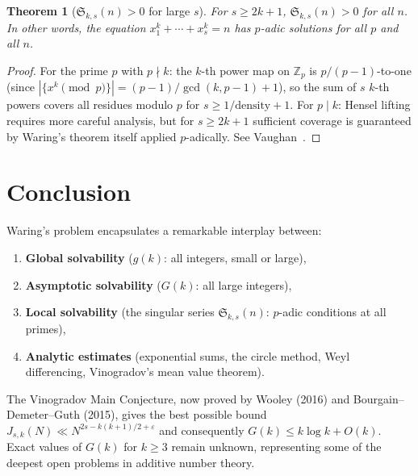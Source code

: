 \documentclass[12pt,a4paper]{amsart}
\newtheorem{theorem}{Theorem}[section]
\theoremstyle{definition}
\newcommand{\Z}{\mathbb{Z}}
\begin{document}
\begin{theorem}[$\mathfrak{S}_{k,s}(n) > 0$ for large $s$]\label{thm:sing_pos}
  For $s \geq 2k + 1$, $\mathfrak{S}_{k,s}(n) > 0$ for all $n$.
  In other words, the equation $x_1^k + \cdots + x_s^k = n$ has
  $p$-adic solutions for all $p$ and all $n$.
\end{theorem}

\begin{proof}
  For the prime $p$ with $p \nmid k$: the $k$-th power map on $\Z_p$ is
  $p/(p-1)$-to-one (since $|\{x^k \pmod p\}| = (p-1)/\gcd(k,p-1) + 1$),
  so the sum of $s$ $k$-th powers covers all residues modulo $p$ for
  $s \geq 1/\text{density} + 1$.  For $p \mid k$: Hensel lifting requires
  more careful analysis, but for $s \geq 2k+1$ sufficient coverage is
  guaranteed by Waring's theorem itself applied $p$-adically.
  See Vaughan~\cite[Chapter~4]{Vaughan1981}.
\end{proof}

\section{Conclusion}

Waring's problem encapsulates a remarkable interplay between:
\begin{enumerate}
  \item \textbf{Global solvability} ($g(k)$: all integers, small or large),
  \item \textbf{Asymptotic solvability} ($G(k)$: all large integers),
  \item \textbf{Local solvability} (the singular series $\mathfrak{S}_{k,s}(n)$:
    $p$-adic conditions at all primes),
  \item \textbf{Analytic estimates} (exponential sums, the circle method,
    Weyl differencing, Vinogradov's mean value theorem).
\end{enumerate}

The Vinogradov Main Conjecture, now proved by Wooley (2016) and
Bourgain--Demeter--Guth (2015), gives the best possible bound
$J_{s,k}(N) \ll N^{2s-k(k+1)/2+\varepsilon}$ and consequently
$G(k) \leq k\log k + O(k)$.  Exact values of $G(k)$ for $k \geq 3$
remain unknown, representing some of the deepest open problems in
additive number theory.
\end{document}
